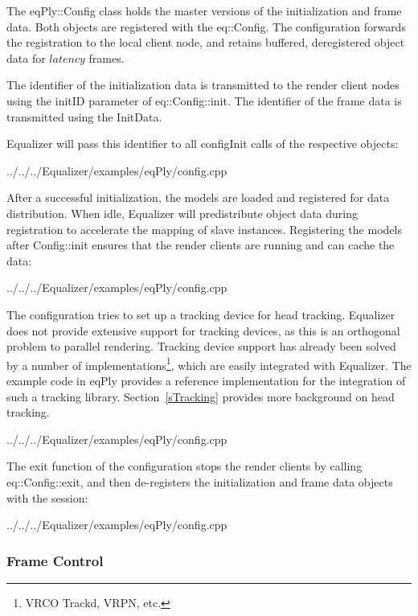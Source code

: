 \documentclass[10pt,a4]{scrartcl}
\newcommand{\sref}[1]{Section~\ref{#1}}
\begin{document}
The \textsf{eqPly::Config} class holds the master versions of the initialization
and frame data. Both objects are registered with the \textsf{eq::Config}. The
configuration forwards the registration to the local client node, and retains
buffered, deregistered object data for $latency$ frames.

The identifier of the initialization data is transmitted to the render client
nodes using the \textsf{initID} parameter of \textsf{eq::Config::init}. The
identifier of the frame data is transmitted using the \textsf{InitData}.

Equalizer will pass this identifier to all \textsf{configInit} calls of
the respective objects:

{\footnotesize
  {../../../Equalizer/examples/eqPly/config.cpp}}

After a successful initialization, the models are loaded and registered for data
distribution. When idle, Equalizer will predistribute object data during
registration to accelerate the mapping of slave instances. Registering the
models after \textsf{Config::init} ensures that the render clients are running
and can cache the data:

{\footnotesize
  {../../../Equalizer/examples/eqPly/config.cpp}}

The configuration tries to set up a tracking device for head tracking. Equalizer
does not provide extensive support for tracking devices, as this is an
orthogonal problem to parallel rendering. Tracking device support has already
been solved by a number of implementations\footnote{VRCO Trackd, VRPN, etc.},
which are easily integrated with Equalizer. The example code in \textsf{eqPly}
provides a reference implementation for the integration of such a tracking
library. \sref{sTracking} provides more background on head tracking.

{\footnotesize
  {../../../Equalizer/examples/eqPly/config.cpp}}

The exit function of the configuration stops the render clients by calling
\textsf{eq::Con\-fig::exit}, and then de-registers the initialization and
frame data objects with the session:

{\footnotesize
  {../../../Equalizer/examples/eqPly/config.cpp}}

\subsubsection{Frame Control}
\end{document}
